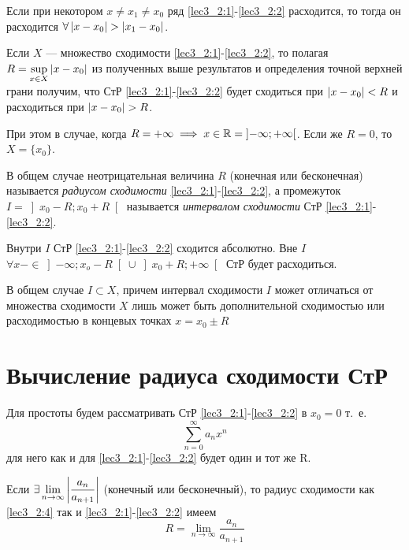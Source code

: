 \documentclass[../../main.tex]{subfiles}
\begin{document}
\begin{crl*}
	Если при некотором $x \ne x_1 \ne x_0$ ряд \eqref{lec3_2:1}-\eqref{lec3_2:2}
	 расходится, то тогда он расходится $\forall \left|{x-x_0}\right| > \left|{x_1-x_0}\right|$.
\end{crl*}	
\begin{rem}
	Если $X$ --- множество сходимости \eqref{lec3_2:1}-\eqref{lec3_2:2}, 
	то полагая $R=\underset{x\in X}{\sup} \left|{x-x_0}\right|$ из полученных выше 
	результатов и определения точной верхней грани получим, 
	что СтР \eqref{lec3_2:1}-\eqref{lec3_2:2}
	будет сходиться при $\left|{x-x_0}\right| < R$ и расходиться при $\abs{x-x_0}>R$.
	
	При этом в случае, когда $R=+\infty \implies 
	x \in \mathbb{R}=\left]-\infty;+\infty\right[$.
	Если же $R=0$, то $X=\{x_0\}$.	
\end{rem}	
В общем  случае неотрицательная величина $R$ (конечная или бесконечная) 
называется \emph{радиусом сходимости}  \eqref{lec3_2:1}-\eqref{lec3_2:2}, а 
промежуток $I=\left]x_0-R;x_0+R\right[$ называется 
\emph{интервалом сходимости} 
СтР \eqref{lec3_2:1}-\eqref{lec3_2:2}.
	
Внутри $I$ СтР \eqref{lec3_2:1}-\eqref{lec3_2:2} сходится абсолютно. Вне $I$
$\forall x-\in\left]-\infty;x_o-R\right[\cup\left]x_0+R;+\infty\right[$
СтР будет расходиться.
	 
В общем случае $I\subset X$, причем интервал сходимости $I$ может
отличаться от множества сходимости $X$ лишь может быть дополнительной 
сходимостью или расходимостью в концевых точках $x=x_0\pm R$
	 
\section{Вычисление радиуса сходимости СтР}
	
Для простоты будем рассматривать СтР \eqref{lec3_2:1}-\eqref{lec3_2:2} в 
$x_0=0$
т.~е. 
\begin{equation}\label{lec3_2:4}
	\sum_{n=0}^{\infty}a_nx^n
\end{equation}
для него как и для \eqref{lec3_2:1}-\eqref{lec3_2:2} будет один и тот же
R.
\begin{thm}
	Если $\exists \lim\limits_{n\to\infty} \left|{\dfrac{a_n}{a_{n+1}}}\right|$ (конечный 
	или 
	бесконечный), то радиус сходимости как \eqref{lec3_2:4} так и 
	\eqref{lec3_2:1}-\eqref{lec3_2:2} имеем
	\begin{equation}
		R=\lim\limits_{n\rightarrow\infty}\frac{a_n}{a_{n+1}}
		\label{lec3_2:5}
	\end{equation}
\end{thm}	
\end{document}
